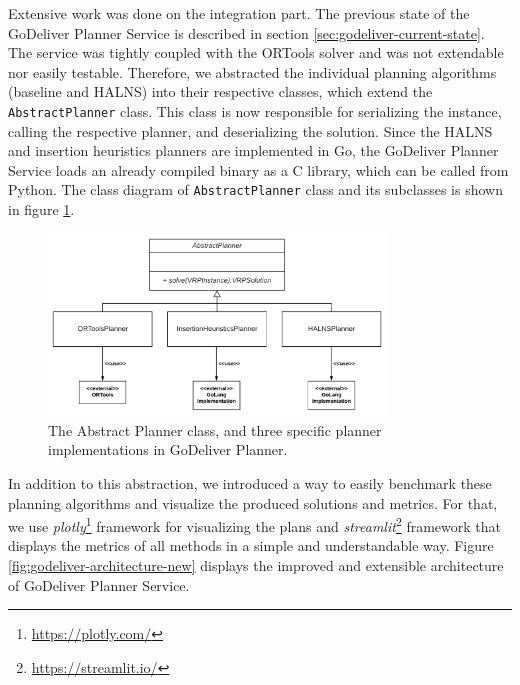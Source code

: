     Extensive work was done on the integration part. The previous state of the GoDeliver Planner Service is described in section \ref{sec:godeliver-current-state}. The service was tightly coupled with the ORTools solver and was not extendable nor easily testable. Therefore, we abstracted the individual planning algorithms (baseline and HALNS) into their respective classes, which extend the \texttt{AbstractPlanner} class. This class is now responsible for serializing the instance, calling the respective planner, and deserializing the solution. Since the HALNS and insertion heuristics planners are implemented in Go, the GoDeliver Planner Service loads an already compiled binary as a C library, which can be called from Python. The class diagram of \texttt{AbstractPlanner} class and its subclasses is shown in figure \ref{fig:abstract-planner-diagram}.
    
    \begin{figure}[!ht]
        \centering
        \includegraphics[width=0.8\textwidth]{figures/abstract-planner-diagram.pdf}
        \caption{The Abstract Planner class, and three specific planner implementations in GoDeliver Planner.}
        \label{fig:abstract-planner-diagram}
    \end{figure}  
    
    In addition to this abstraction, we introduced a way to easily benchmark these planning algorithms and visualize the produced solutions and metrics. For that, we use \emph{plotly}\footnote{\url{https://plotly.com/}} framework for visualizing the plans and \emph{streamlit}\footnote{\url{https://streamlit.io/}} framework that displays the metrics of all methods in a simple and understandable way. Figure \ref{fig:godeliver-architecture-new} displays the improved and extensible architecture of GoDeliver Planner Service.
    
